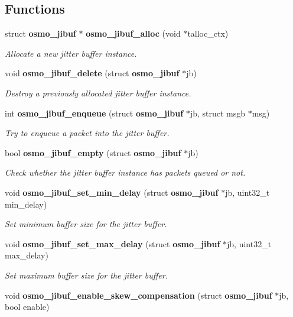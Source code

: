 \subsection*{Functions}
\begin{DoxyCompactItemize}
\item 
struct {\bf osmo\+\_\+jibuf} $\ast$ {\bf osmo\+\_\+jibuf\+\_\+alloc} (void $\ast$talloc\+\_\+ctx)
\begin{DoxyCompactList}\small\item\em Allocate a new jitter buffer instance. \end{DoxyCompactList}\item 
void {\bf osmo\+\_\+jibuf\+\_\+delete} (struct {\bf osmo\+\_\+jibuf} $\ast$jb)
\begin{DoxyCompactList}\small\item\em Destroy a previously allocated jitter buffer instance. \end{DoxyCompactList}\item 
int {\bf osmo\+\_\+jibuf\+\_\+enqueue} (struct {\bf osmo\+\_\+jibuf} $\ast$jb, struct msgb $\ast$msg)
\begin{DoxyCompactList}\small\item\em Try to enqueue a packet into the jitter buffer. \end{DoxyCompactList}\item 
bool {\bf osmo\+\_\+jibuf\+\_\+empty} (struct {\bf osmo\+\_\+jibuf} $\ast$jb)
\begin{DoxyCompactList}\small\item\em Check whether the jitter buffer instance has packets queued or not. \end{DoxyCompactList}\item 
void {\bf osmo\+\_\+jibuf\+\_\+set\+\_\+min\+\_\+delay} (struct {\bf osmo\+\_\+jibuf} $\ast$jb, uint32\+\_\+t min\+\_\+delay)
\begin{DoxyCompactList}\small\item\em Set minimum buffer size for the jitter buffer. \end{DoxyCompactList}\item 
void {\bf osmo\+\_\+jibuf\+\_\+set\+\_\+max\+\_\+delay} (struct {\bf osmo\+\_\+jibuf} $\ast$jb, uint32\+\_\+t max\+\_\+delay)
\begin{DoxyCompactList}\small\item\em Set maximum buffer size for the jitter buffer. \end{DoxyCompactList}\item 
void {\bf osmo\+\_\+jibuf\+\_\+enable\+\_\+skew\+\_\+compensation} (struct {\bf osmo\+\_\+jibuf} $\ast$jb, bool enable)

\end{DoxyCompactItemize}
